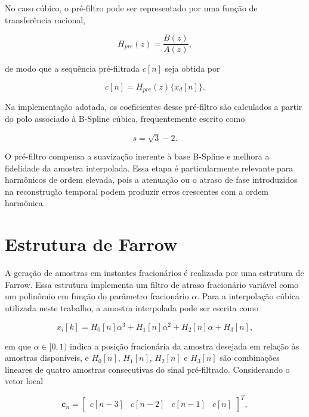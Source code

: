 No caso cúbico, o pré-filtro pode ser representado por uma função de transferência racional,

\begin{equation}
H_{pre}(z) = \frac{B(z)}{A(z)},
\label{eq:prefiltro_bspline}
\end{equation}

\noindent de modo que a sequência pré-filtrada $c[n]$ seja obtida por

\begin{equation}
c[n] = H_{pre}(z)\{x_d[n]\}.
\label{eq:coef_bspline}
\end{equation}

Na implementação adotada, os coeficientes desse pré-filtro são calculados a partir do polo associado à B-Spline cúbica, frequentemente escrito como

\begin{equation}
s = \sqrt{3} - 2.
\label{eq:polo_bspline}
\end{equation}

O pré-filtro compensa a suavização inerente à base B-Spline e melhora a fidelidade da amostra interpolada. Essa etapa é particularmente relevante para harmônicos de ordem elevada, pois a atenuação ou o atraso de fase introduzidos na reconstrução temporal podem produzir erros crescentes com a ordem harmônica.

\section{Estrutura de Farrow}

A geração de amostras em instantes fracionários é realizada por uma estrutura de Farrow. Essa estrutura implementa um filtro de atraso fracionário variável como um polinômio em função do parâmetro fracionário $\alpha$. Para a interpolação cúbica utilizada neste trabalho, a amostra interpolada pode ser escrita como

\begin{equation}
x_i[k] = H_0[n]\alpha^3 + H_1[n]\alpha^2 + H_2[n]\alpha + H_3[n],
\label{eq:farrow_polinomio}
\end{equation}

\noindent em que $\alpha \in [0,1)$ indica a posição fracionária da amostra desejada em relação às amostras disponíveis, e $H_0[n]$, $H_1[n]$, $H_2[n]$ e $H_3[n]$ são combinações lineares de quatro amostras consecutivas do sinal pré-filtrado. Considerando o vetor local

\begin{equation}
\mathbf{c}_n =
\begin{bmatrix}
c[n-3] & c[n-2] & c[n-1] & c[n]
\end{bmatrix}^{T},
\label{eq:vetor_farrow}
\end{equation}

